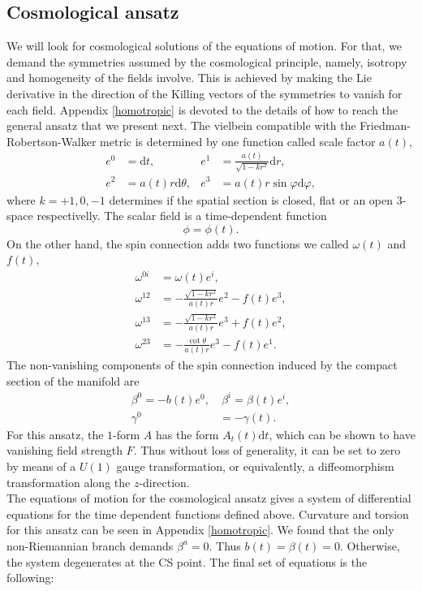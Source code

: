 \documentclass[aps,prd,12pt,superscriptaddress,showpacs,showkeys,longbibliography,reprint]{revtex4-1}
\begin{document}
\subsection{Cosmological ansatz}
We will look for cosmological solutions of the equations of motion. For that, we demand the symmetries assumed by the cosmological principle, namely, isotropy and homogeneity of the fields involve. This is achieved by making the Lie derivative in the direction of the Killing vectors of the symmetries to vanish for each field. Appendix \ref{homotropic} is devoted to the details of how to reach the general ansatz that we present next. The vielbein compatible with the Friedman-Robertson-Walker metric is determined by one function called scale factor $a(t)$,
\begin{align}
  \label{vielbein cosmo}
  e^0&=\mbox{d}t, & e^1&=\frac{a(t)}{\sqrt{1-kr^2}}\mbox{d}r,\\
  e^2&=a(t)r\mbox{d}\theta, & e^3&=a(t)r\sin\varphi\mbox{d}\varphi, 
\end{align}
where $k=+1,0,-1$ determines if the spatial section is closed, flat or an open $3$-space respectivelly. The scalar field is a time-dependent function
\begin{equation}
  \phi=\phi(t).
\end{equation}
On the other hand, the spin connection adds two functions we called $\omega(t)$ and $f(t)$,
\begin{align}
  \omega^{0i}&=\omega(t) e^i,\\
  \omega^{12}&=-\frac{\sqrt{1-kr^2}}{a(t)r}e^2-f(t)e^3,\\
  \omega^{13}&=-\frac{\sqrt{1-kr^2}}{a(t)r}e^3+f(t)e^2,\\
  \omega^{23}&=-\frac{\cot\theta}{a(t)r}e^3-f(t)e^1.
\end{align}
The non-vanishing components of the spin connection induced by the compact section of the manifold are
\begin{align}
  \beta^0=-b(t)e^0,&\ \beta^i=\beta(t)e^i,\\
  \label{gamma cosmo}
  \gamma^0&=-\gamma(t).
\end{align}
For this ansatz, the $1$-form $A$ has the form $A_t(t)\text{d}t$, which can be shown to have vanishing field strength $F$. Thus without loss of generality, it can be set to zero by means of a $U(1)$ gauge transformation, or equivalently, a diffeomorphism transformation along the $z$-direction.\\
The equations of motion for the cosmological ansatz gives a system of differential equations for the time dependent functions defined above. Curvature and torsion for this ansatz can be seen in Appendix \ref{homotropic}. We found that the only non-Riemannian branch demands  $\beta^a=0$. Thus $b(t)=\beta(t)=0$. Otherwise, the system degenerates at the CS point. The final set of equations is the following:
\end{document}
